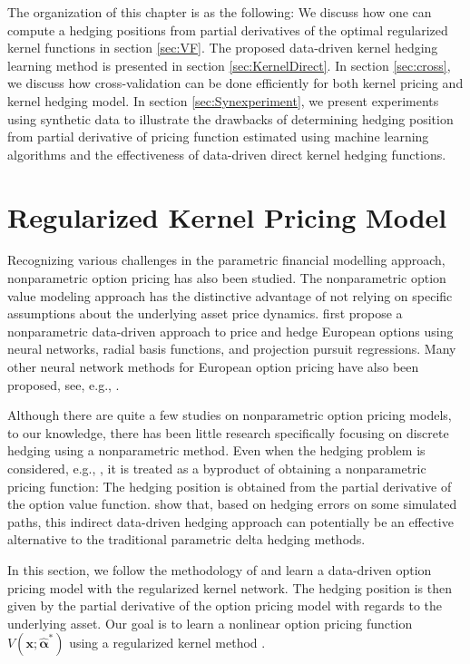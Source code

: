 \documentclass[letterpaper,12pt,titlepage,oneside,final]{book}
\numberwithin{equation}{section}
\theoremstyle{definition}
\newcommand{\vx}{\mathbf{x}}
\newcommand{\valpha}{\pmb{\widehat{\alpha}}}
\begin{document}
The organization of this chapter is as the following:
We discuss how one can compute a hedging positions from partial derivatives of the optimal regularized kernel functions in section \ref{sec:VF}. The proposed data-driven kernel hedging learning method is presented in section \ref{sec:KernelDirect}. In section \ref{sec:cross}, we discuss how cross-validation can be done efficiently for both kernel pricing and kernel hedging model. In section \ref{sec:Synexperiment}, we present experiments using synthetic data to illustrate the drawbacks of determining hedging position from partial derivative of pricing function estimated using machine learning algorithms and the effectiveness of data-driven direct kernel hedging functions.

\section{Regularized Kernel Pricing Model} 
\label{sec:RegularizedNW}
 Recognizing various challenges in the parametric financial modelling approach,
 nonparametric option pricing has also been studied. The nonparametric option value modeling approach has the distinctive advantage of not relying on specific assumptions about the underlying asset price dynamics. \citet{hutchinson} first propose a nonparametric data-driven approach to price and hedge European options using neural networks, radial basis functions, and projection pursuit regressions. Many other neural network methods for European option pricing have also been proposed, see, e.g., \citep{yao2000option,bennell2004black,gradojevic2009option,garcia2000pricing,malliaris1993neural}.


Although there are  quite a few studies on  nonparametric option pricing models, to our knowledge, there has been little research specifically focusing on discrete hedging using a nonparametric method. Even when the hedging problem is considered, e.g.,  \citep{hutchinson}, it is treated as a byproduct of obtaining a nonparametric  pricing function: The hedging position is obtained from the partial derivative of the option value function. \citet{hutchinson} show that, based on hedging errors on some simulated paths,  this indirect data-driven hedging approach can potentially be an effective alternative to the traditional parametric delta hedging methods.

In this section, we follow the methodology of \cite{hutchinson} and learn a data-driven option pricing model with the regularized kernel network. The hedging position is then given by the partial derivative of the option pricing model with regards to the underlying asset. Our goal is to learn a nonlinear option pricing function $V(\vx;\valpha^*)$  using a regularized kernel method \cite{evgeniou2000regularization}. 
\end{document}
